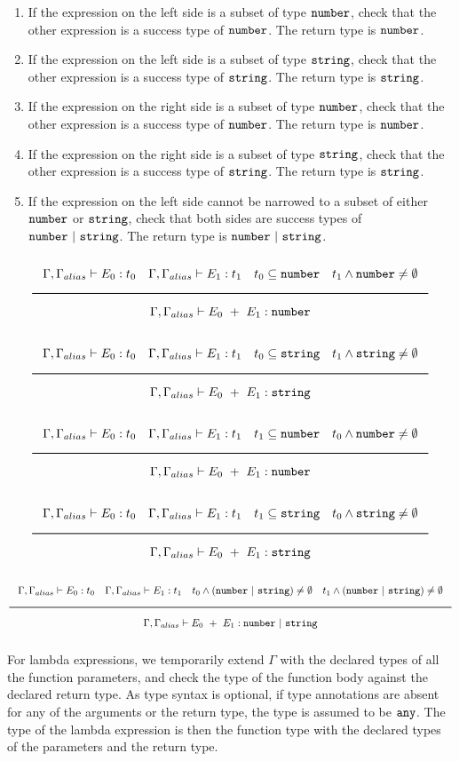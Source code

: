 \begin{enumerate}
\item{If the expression on the left side is a subset of type $\texttt{number}$,
  check that the other expression is a success type of $\texttt{number}$. The return type is $\texttt{number}$.}
\item{If the expression on the left side is a subset of type $\texttt{string}$,
  check that the other expression is a success type of $\texttt{string}$. The return type is $\texttt{string}$.}
\item{If the expression on the right side is a subset of type $\texttt{number}$,
  check that the other expression is a success type of $\texttt{number}$. The return type is $\texttt{number}$.}
\item{If the expression on the right side is a subset of type $\texttt{string}$,
  check that the other expression is a success type of $\texttt{string}$. The return type is $\texttt{string}$.}
\item{If the expression on the left side cannot be narrowed to a subset of either $\texttt{number}$ or $\texttt{string}$, check that both sides are success types of 
  $\Number\ |\ \String$. The return type is $\Number\ |\ \String$.}
\end{enumerate}

\noindent
\[
  \Rule{\Gamma, \Gamma_{alias} \vdash E_0 : t_0 \quad \Gamma, \Gamma_{alias} \vdash E_1 : t_1 \quad t_0 \subseteq \Number
    \quad t_1 \wedge \Number \neq \emptyset}{\Gamma, \Gamma_{alias} \vdash E_0\ + \ E_1 : \Number}
\]
\noindent
\[
  \Rule{\Gamma, \Gamma_{alias} \vdash E_0 : t_0 \quad \Gamma, \Gamma_{alias} \vdash E_1 : t_1 \quad t_0 \subseteq \String
    \quad t_1 \wedge \String \neq \emptyset}{\Gamma, \Gamma_{alias} \vdash E_0\ + \ E_1 : \String}
\]
\noindent
\[
  \Rule{\Gamma, \Gamma_{alias} \vdash E_0 : t_0 \quad \Gamma, \Gamma_{alias} \vdash E_1 : t_1 \quad t_1 \subseteq \Number
    \quad t_0 \wedge \Number \neq \emptyset}{\Gamma, \Gamma_{alias} \vdash E_0\ + \ E_1 : \Number}
\]
\noindent
\[
  \Rule{\Gamma, \Gamma_{alias} \vdash E_0 : t_0 \quad \Gamma, \Gamma_{alias} \vdash E_1 : t_1 \quad t_1 \subseteq \String
    \quad t_0 \wedge \String \neq \emptyset}{\Gamma, \Gamma_{alias} \vdash E_0\ + \ E_1 : \String}
\]
\noindent
\[
  \Rule{\Gamma, \Gamma_{alias} \vdash E_0 : t_0 \quad \Gamma, \Gamma_{alias} \vdash E_1 : t_1 \quad t_0 \wedge (\Number\ |\ \String) \neq \emptyset
    \quad t_1 \wedge (\Number\ |\ \String) \neq \emptyset}{\Gamma, \Gamma_{alias} \vdash E_0\ + \ E_1 : \Number\ |\ \String}
\]
\noindent

For lambda expressions, we temporarily extend $\Gamma$ with the declared types of all the function parameters,
and check the type of the function body against the declared return type.
As type syntax is optional, if type annotations are absent for any of the arguments or the return type, the type is assumed to be $\texttt{any}$.
The type of the lambda expression is then the function type with the declared types of the parameters and the return type. 

